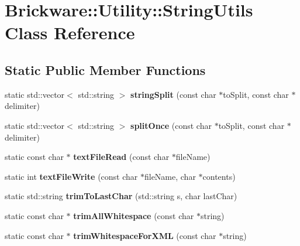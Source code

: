 \hypertarget{classBrickware_1_1Utility_1_1StringUtils}{}\section{Brickware\+:\+:Utility\+:\+:String\+Utils Class Reference}
\label{classBrickware_1_1Utility_1_1StringUtils}
\subsection*{Static Public Member Functions}
\begin{DoxyCompactItemize}
\item 
\hypertarget{classBrickware_1_1Utility_1_1StringUtils_abfb08230b2ea07c1d1175a271a637912}{}static std\+::vector$<$ std\+::string $>$ {\bfseries string\+Split} (const char $\ast$to\+Split, const char $\ast$delimiter)\label{classBrickware_1_1Utility_1_1StringUtils_abfb08230b2ea07c1d1175a271a637912}

\item 
\hypertarget{classBrickware_1_1Utility_1_1StringUtils_a389720035180485228f6a3f966694037}{}static std\+::vector$<$ std\+::string $>$ {\bfseries split\+Once} (const char $\ast$to\+Split, const char $\ast$delimiter)\label{classBrickware_1_1Utility_1_1StringUtils_a389720035180485228f6a3f966694037}

\item 
\hypertarget{classBrickware_1_1Utility_1_1StringUtils_a4ebaa8c2813e4357285dd6023ecb8d43}{}static const char $\ast$ {\bfseries text\+File\+Read} (const char $\ast$file\+Name)\label{classBrickware_1_1Utility_1_1StringUtils_a4ebaa8c2813e4357285dd6023ecb8d43}

\item 
\hypertarget{classBrickware_1_1Utility_1_1StringUtils_a3dd7e9110845fa3e13cad497124ab292}{}static int {\bfseries text\+File\+Write} (const char $\ast$file\+Name, char $\ast$contents)\label{classBrickware_1_1Utility_1_1StringUtils_a3dd7e9110845fa3e13cad497124ab292}

\item 
\hypertarget{classBrickware_1_1Utility_1_1StringUtils_a2b98b53de56648ace36d0c26d129193d}{}static std\+::string {\bfseries trim\+To\+Last\+Char} (std\+::string s, char last\+Char)\label{classBrickware_1_1Utility_1_1StringUtils_a2b98b53de56648ace36d0c26d129193d}

\item 
\hypertarget{classBrickware_1_1Utility_1_1StringUtils_ac8de862442eff99e0c22fdddebacc164}{}static const char $\ast$ {\bfseries trim\+All\+Whitespace} (const char $\ast$string)\label{classBrickware_1_1Utility_1_1StringUtils_ac8de862442eff99e0c22fdddebacc164}

\item 
\hypertarget{classBrickware_1_1Utility_1_1StringUtils_abac3ef7860a572a90a564f11e18ae85f}{}static const char $\ast$ {\bfseries trim\+Whitespace\+For\+X\+M\+L} (const char $\ast$string)\label{classBrickware_1_1Utility_1_1StringUtils_abac3ef7860a572a90a564f11e18ae85f}

\end{DoxyCompactItemize}


